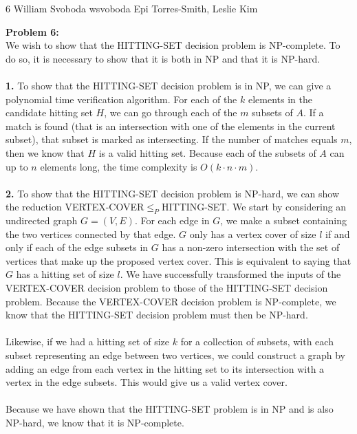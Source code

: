 \documentclass[12pt,letterpaper]{cos340hw}
\begin{document}
           {6}            %
           {William Svoboda}  %
           {wsvoboda}   %
           {Epi Torres-Smith, Leslie Kim} 




\noindent\textbf{Problem 6:}\\
We wish to show that the HITTING-SET decision problem is NP-complete. To do so, it is necessary 
to show that it is both in NP and that it is NP-hard.\\\\
\noindent\textbf{1.} To show that the HITTING-SET decision problem is in NP, we can give a 
polynomial time verification algorithm. For each of the $k$ elements in the candidate hitting set $H$, 
we can go through each of the $m$ subsets of $A$. If a match is found (that is an intersection with one of 
the elements in the current subset), that subset is marked as intersecting. If the number of matches equals 
$m$, then we know that $H$ is a valid hitting set. Because each of the subsets of $A$ can up to $n$ elements 
long, the time complexity is $O(k \cdot n \cdot m)$.\\\\
\noindent\textbf{2.} To show that the HITTING-SET decision problem is NP-hard, we can show the 
reduction VERTEX-COVER$\le_P$HITTING-SET. We start by considering an undirected graph 
$G=(V,E)$. For each edge in $G$, we make a subset containing the two vertices connected by that edge. 
$G$ only has a vertex cover of size $l$ if and only if each of the edge subsets in $G$ has a non-zero intersection 
with the set of vertices that make up the proposed vertex cover. This is equivalent to saying that $G$ has a hitting set 
of size $l$. We have successfully transformed the inputs of the VERTEX-COVER decision problem to those of the 
HITTING-SET decision problem. Because the VERTEX-COVER decision problem is NP-complete, 
we know that the HITTING-SET decision problem must then be NP-hard.\\\\
Likewise, if we had a hitting set of size $k$ for a collection of subsets, with each subset 
representing an edge between two vertices, we could construct a graph by adding an edge from each vertex 
in the hitting set to its intersection with a vertex in the edge subsets. This would give us a valid vertex cover.\\\\
Because we have shown that the HITTING-SET problem is in NP and is also NP-hard, we know that it 
is NP-complete.
 

\end{document}
